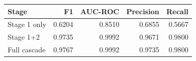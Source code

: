 \begin{tabular}{lrrrr}
\toprule
Stage & F1 & AUC-ROC & Precision & Recall \\
\midrule
Stage 1 only & 0.6204 & 0.8510 & 0.6855 & 0.5667 \\
Stage 1+2 & 0.9735 & 0.9992 & 0.9671 & 0.9800 \\
Full cascade & 0.9767 & 0.9992 & 0.9735 & 0.9800 \\
\bottomrule
\end{tabular}
